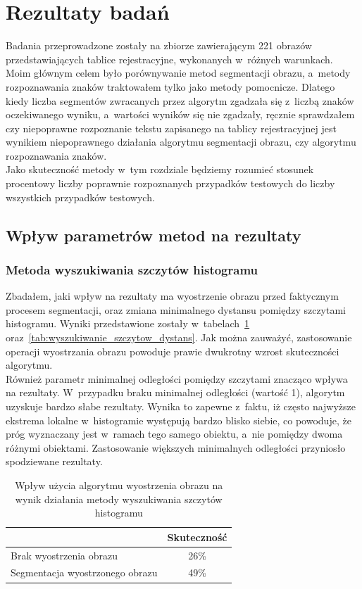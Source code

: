 \section{Rezultaty badań}
Badania przeprowadzone zostały na zbiorze zawierającym 221 obrazów przedstawiających tablice rejestracyjne, wykonanych w~różnych warunkach. Moim głównym celem było porównywanie metod segmentacji obrazu, a~metody rozpoznawania znaków traktowałem tylko jako metody pomocnicze. Dlatego kiedy liczba segmentów zwracanych przez algorytm zgadzała się z~liczbą znaków oczekiwanego wyniku, a~wartości wyników się nie zgadzały, ręcznie sprawdzałem czy niepoprawne rozpoznanie tekstu zapisanego na tablicy rejestracyjnej jest wynikiem niepoprawnego działania algorytmu segmentacji obrazu, czy algorytmu rozpoznawania znaków. \\
Jako skuteczność metody w~tym rozdziale będziemy rozumieć stosunek procentowy liczby poprawnie rozpoznanych przypadków testowych do liczby wszystkich przypadków testowych.

\subsection{Wpływ parametrów metod na rezultaty}
\subsubsection{Metoda wyszukiwania szczytów histogramu}\label{sssec:histogram_peaks_results}
Zbadałem, jaki wpływ na rezultaty ma wyostrzenie obrazu przed faktycznym procesem segmentacji, oraz zmiana minimalnego dystansu pomiędzy szczytami histogramu. Wyniki przedstawione zostały w~tabelach~\ref{tab:wyszukiwanie_szczytow_wyostrz} oraz~\ref{tab:wyszukiwanie_szczytow_dystans}. Jak można zauważyć, zastosowanie operacji wyostrzania obrazu powoduje prawie dwukrotny wzrost skuteczności algorytmu. \\
Również parametr minimalnej odległości pomiędzy szczytami znacząco wpływa na rezultaty. W~przypadku braku minimalnej odległości (wartość 1), algorytm uzyskuje bardzo słabe rezultaty. Wynika to zapewne z~faktu, iż często najwyższe ekstrema lokalne w~histogramie występują bardzo blisko siebie, co powoduje, że próg wyznaczany jest w~ramach tego samego obiektu, a~nie pomiędzy dwoma różnymi obiektami. Zastosowanie większych minimalnych odległości przyniosło spodziewane rezultaty. 

\begin {table}[H]
  \begin{center}
    \begin{tabular}{l | c}
      \space & Skuteczność \\
      \hline
      Brak wyostrzenia obrazu & 26\% \\
      Segmentacja wyostrzonego obrazu & 49\%
    \end{tabular}
    \caption {Wpływ użycia algorytmu wyostrzenia obrazu na wynik działania metody wyszukiwania szczytów histogramu}
    \label{tab:wyszukiwanie_szczytow_wyostrz} 
  \end{center}
\end {table}

